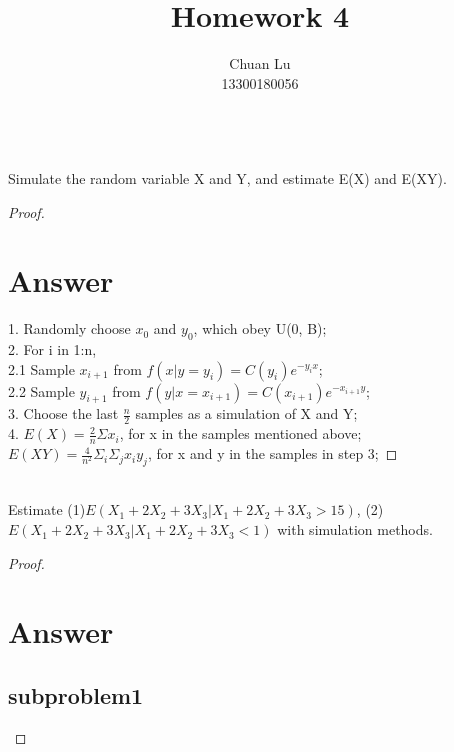 \documentclass{article}
\newenvironment{problem}[2][Problem]{\begin{trivlist}
\item[\hskip \labelsep {\bfseries #1}\hskip \labelsep {\bfseries #2.}]}{\end{trivlist}}
\begin{document}
\title{Homework 4}
\author{Chuan Lu\\
13300180056}

\maketitle

\begin{problem}{1}
\text{ }\\
Simulate the random variable X and Y, and estimate E(X) and E(XY).
\end{problem}

\begin{proof}
\section{Answer}
1. Randomly choose $x_{0}$ and $y_{0}$, which obey U(0, B);\\
2. For i in 1:n, \\
2.1 Sample $x_{i+1}$ from $f(x|y = y_{i}) = C(y_{i})e^{-y_{i}x}$; \\
2.2 Sample $y_{i+1}$ from $f(y|x = x_{i+1}) = C(x_{i+1})e^{-x_{i+1}y}$; \\
3. Choose the last $\frac{n}{2}$ samples as a simulation of X and Y; \\
4. $E(X) = \frac{2}{n}\Sigma x_{i}$, for x in the samples mentioned above;
$\quad$ $E(XY) = \frac{4}{n^2}\Sigma_{i}\Sigma_{j} x_{i}y_{j}$, for x and y in the samples in step 3;
\end{proof}


\begin{problem}{2}
\text{ }\\
Estimate (1)$E(X_1+2X_2+3X_3|X_1+2X_2+3X_3>15)$, (2)$E(X_1+2X_2+3X_3|X_1+2X_2+3X_3<1)$ with simulation methods.
\end{problem}
\begin{proof}
\section{Answer}
\subsection{subproblem1}

\end{proof}
\end{document}
